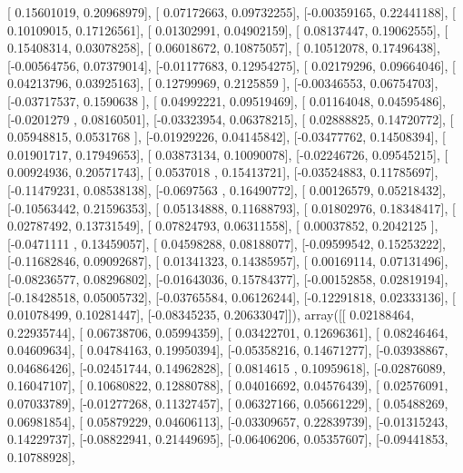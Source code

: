 \documentclass{article}
\begin{document}
       [ 0.15601019,  0.20968979],
       [ 0.07172663,  0.09732255],
       [-0.00359165,  0.22441188],
       [ 0.10109015,  0.17126561],
       [ 0.01302991,  0.04902159],
       [ 0.08137447,  0.19062555],
       [ 0.15408314,  0.03078258],
       [ 0.06018672,  0.10875057],
       [ 0.10512078,  0.17496438],
       [-0.00564756,  0.07379014],
       [-0.01177683,  0.12954275],
       [ 0.02179296,  0.09664046],
       [ 0.04213796,  0.03925163],
       [ 0.12799969,  0.2125859 ],
       [-0.00346553,  0.06754703],
       [-0.03717537,  0.1590638 ],
       [ 0.04992221,  0.09519469],
       [ 0.01164048,  0.04595486],
       [-0.0201279 ,  0.08160501],
       [-0.03323954,  0.06378215],
       [ 0.02888825,  0.14720772],
       [ 0.05948815,  0.0531768 ],
       [-0.01929226,  0.04145842],
       [-0.03477762,  0.14508394],
       [ 0.01901717,  0.17949653],
       [ 0.03873134,  0.10090078],
       [-0.02246726,  0.09545215],
       [ 0.00924936,  0.20571743],
       [ 0.0537018 ,  0.15413721],
       [-0.03524883,  0.11785697],
       [-0.11479231,  0.08538138],
       [-0.0697563 ,  0.16490772],
       [ 0.00126579,  0.05218432],
       [-0.10563442,  0.21596353],
       [ 0.05134888,  0.11688793],
       [ 0.01802976,  0.18348417],
       [ 0.02787492,  0.13731549],
       [ 0.07824793,  0.06311558],
       [ 0.00037852,  0.2042125 ],
       [-0.0471111 ,  0.13459057],
       [ 0.04598288,  0.08188077],
       [-0.09599542,  0.15253222],
       [-0.11682846,  0.09092687],
       [ 0.01341323,  0.14385957],
       [ 0.00169114,  0.07131496],
       [-0.08236577,  0.08296802],
       [-0.01643036,  0.15784377],
       [-0.00152858,  0.02819194],
       [-0.18428518,  0.05005732],
       [-0.03765584,  0.06126244],
       [-0.12291818,  0.02333136],
       [ 0.01078499,  0.10281447],
       [-0.08345235,  0.20633047]]), array([[ 0.02188464,  0.22935744],
       [ 0.06738706,  0.05994359],
       [ 0.03422701,  0.12696361],
       [ 0.08246464,  0.04609634],
       [ 0.04784163,  0.19950394],
       [-0.05358216,  0.14671277],
       [-0.03938867,  0.04686426],
       [-0.02451744,  0.14962828],
       [ 0.0814615 ,  0.10959618],
       [-0.02876089,  0.16047107],
       [ 0.10680822,  0.12880788],
       [ 0.04016692,  0.04576439],
       [ 0.02576091,  0.07033789],
       [-0.01277268,  0.11327457],
       [ 0.06327166,  0.05661229],
       [ 0.05488269,  0.06981854],
       [ 0.05879229,  0.04606113],
       [-0.03309657,  0.22839739],
       [-0.01315243,  0.14229737],
       [-0.08822941,  0.21449695],
       [-0.06406206,  0.05357607],
       [-0.09441853,  0.10788928],
\end{document}
